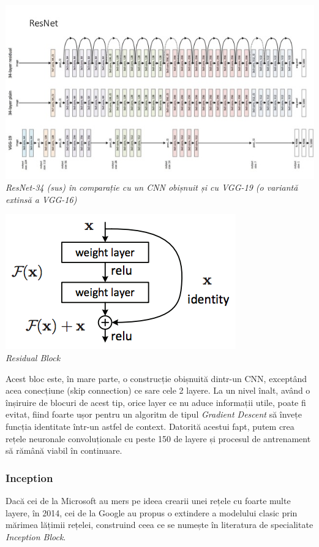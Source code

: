 \begin{center}
\includegraphics[scale=0.5]{resnet} \\
\textit{ResNet-34 (sus) în comparație cu un CNN obișnuit și cu VGG-19 (o variantă extinsă a VGG-16)}
\end{center}

\begin{center}
\includegraphics[scale=0.7]{residualBlock} \\
\textit{Residual Block}
\end{center}

Acest bloc este, în mare parte, o construcție obișnuită dintr-un CNN, exceptând acea conecțiune (skip connection) ce sare cele 2 layere. La un nivel înalt, având o înșiruire de blocuri de acest tip, orice layer ce nu aduce informații utile, poate fi evitat, fiind foarte ușor pentru un algoritm de tipul \textit{Gradient Descent} să învețe funcția identitate într-un astfel de context. Datorită acestui fapt, putem crea rețele neuronale convoluționale cu peste 150 de layere și procesul de antrenament să rămână viabil în continuare.

\subsubsection{Inception}
Dacă cei de la Microsoft au mers pe ideea crearii unei rețele cu foarte multe layere, în 2014, cei de la Google au propus o extindere a modelului clasic prin mărimea lățimii rețelei, construind ceea ce se numește în literatura de specialitate \textit{Inception Block}.

